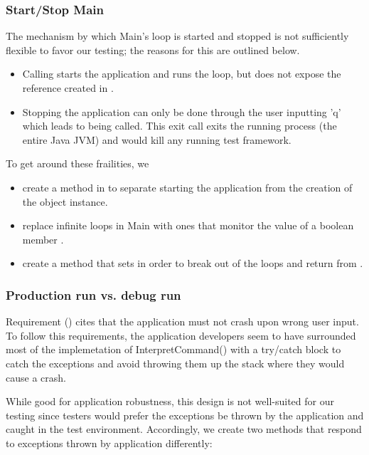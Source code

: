 \subsubsection{Start/Stop Main}
\label{sec:start-stop-main}
The mechanism by which Main's loop is started and stopped is not sufficiently flexible to favor our testing; the reasons for this are outlined below.
\begin{itemize}
	\item Calling  starts the application and runs the loop, but does not expose the  reference created in . 
	\item Stopping the application can only be done through the user inputting 'q' which leads to  being called. This exit call exits the running process (the entire Java JVM) and would kill any running test framework.
\end{itemize}

To get around these frailities, we
\begin{itemize}
	\item create a method  in  to separate starting the application from the creation of the  object instance. 
	\item replace infinite loops in Main with ones that monitor the value of a boolean member . 
	\item create a method  that sets  in order to break out of the loops and return from .
\end{itemize}

\subsubsection{Production run vs. debug run}
\label{sec:production-vs-debug}
Requirement (\RSeven) cites that the application must not crash upon wrong user input. To follow this requirements, the application developers seem to have surrounded most of the implemetation of InterpretCommand() with a try/catch block to catch the exceptions and avoid throwing them up the stack where they would cause a crash.
\par 
While good for application robustness, this design is not well-suited for our testing since testers would prefer the exceptions be thrown by the application and caught in the test environment. Accordingly, we create two  methods that respond to exceptions thrown by application differently: 

